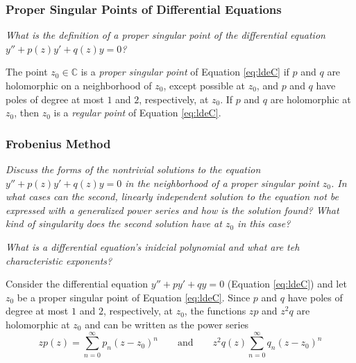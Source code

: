 \documentclass[11pt, a4paper]{article}
\newcommand{\question}[1]{\textit{#1}\vspace{2mm}}
\newcommand{\C}{\mathbb{C}} %
\begin{document}
\subsubsection{Proper Singular Points of Differential Equations}
\question{ What is the definition of a proper singular point of the differential equation $ y'' + p(z)y' + q(z)y = 0 $?}

The point $ z_{0} \in \C $ is a \textit{proper singular point} of Equation \ref{eq:ldeC} if $ p $ and $ q $ are holomorphic on a neighborhood of $ z_{0} $, except possible at $ z_{0} $, and $ p $ and $ q $ have poles of degree at most $ 1 $ and $ 2 $, respectively, at $ z_{0} $. If $ p $ and $ q $ are holomorphic at $ z_{0} $, then $ z_{0} $ is a \textit{regular point} of Equation \ref{eq:ldeC}.
	


\subsubsection{Frobenius Method}
\question{Discuss the forms of the nontrivial solutions to the equation $ y'' + p(z)y' + q(z)y = 0 $ in the neighborhood of a proper singular point $ z_0 $. In what cases can the second, linearly independent solution to the equation not be expressed with a generalized power series and how is the solution found? What kind of singularity does the second solution have at $ z_0 $ in this case? }

\question{What is a differential equation's inidcial polynomial and what are teh characteristic exponents?}

Consider the differential equation $ y'' + py' + qy = 0 $ (Equation \ref{eq:ldeC}) and let $ z_{0} $ be a proper singular point of Equation \ref{eq:ldeC}. Since $ p $ and $ q $ have poles of degree at most $ 1 $ and $ 2 $, respectively, at $ z_{0} $, the functions $ zp $ and $ z^{2}q $ are holomorphic at $ z_{0} $ and can be written as the power series
\begin{equation*}
	z p(z) = \sum_{n=0}^{\infty} p_n (z-z_{0})^n \qquad \text{and} \qquad z^{2}q(z) \sum_{n=0}^{\infty} q_n (z-z_{0})^n
\end{equation*}
\end{document}
